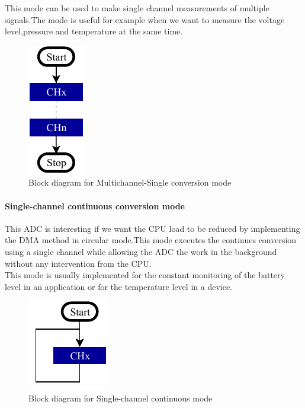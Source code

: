 \documentclass[a4paper, 11pt, openany, oneside]{book}
\begin{document}
This mode can be used to make single channel measurements of multiple signals.The mode is useful for example when we want to measure the voltage level,pressure and temperature at the same time. 



\begin{figure}[b]
\centering
\includegraphics[width= 0.2\linewidth]{HS_STM32-single-channel_multi-single-conversion.pdf}
\caption{Block diagram for Multichannel-Single conversion mode}
\end{figure}







\newpage

\paragraph{Single-channel continuous conversion mode}
This ADC is interesting if we want the CPU load to be reduced by implementing the DMA  method in circular mode.This mode executes the  continues conversion using a single channel while allowing the ADC the work in the background without any intervention from the CPU.\\

This mode is usually implemented for the constant monitoring of the battery level in an application or for the temperature level in a device. 


\begin{figure}[b] %
\centering
\includegraphics[width= 0.2\linewidth]{HS_STM32-single-channel_single_continuous.pdf}
\caption{Block diagram for Single-channel continuous mode}
\end{figure}
\end{document}
